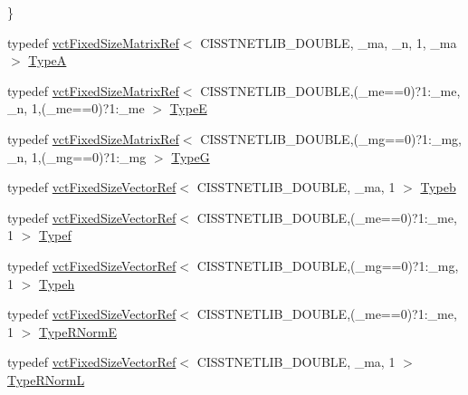 \begin{DoxyCompactItemize}
 \}
\item 
typedef \hyperlink{classvct_fixed_size_matrix_ref}{vct\+Fixed\+Size\+Matrix\+Ref}$<$ C\+I\+S\+S\+T\+N\+E\+T\+L\+I\+B\+\_\+\+D\+O\+U\+B\+L\+E, \+\_\+ma, \+\_\+n, 1, \+\_\+ma $>$ \hyperlink{classnmr_l_sq_lin_solution_fixed_size_a7a9b41c20d4c0b44cdae4bf7b39f7e39}{Type\+A}
\item 
typedef \hyperlink{classvct_fixed_size_matrix_ref}{vct\+Fixed\+Size\+Matrix\+Ref}$<$ C\+I\+S\+S\+T\+N\+E\+T\+L\+I\+B\+\_\+\+D\+O\+U\+B\+L\+E,(\+\_\+me==0)?1\+:\+\_\+me, \+\_\+n, 1,(\+\_\+me==0)?1\+:\+\_\+me $>$ \hyperlink{classnmr_l_sq_lin_solution_fixed_size_a74ac0c633236e0b04e8969f7fbfc92a6}{Type\+E}
\item 
typedef \hyperlink{classvct_fixed_size_matrix_ref}{vct\+Fixed\+Size\+Matrix\+Ref}$<$ C\+I\+S\+S\+T\+N\+E\+T\+L\+I\+B\+\_\+\+D\+O\+U\+B\+L\+E,(\+\_\+mg==0)?1\+:\+\_\+mg, \+\_\+n, 1,(\+\_\+mg==0)?1\+:\+\_\+mg $>$ \hyperlink{classnmr_l_sq_lin_solution_fixed_size_a043640ee3f0a5a11b4b6972ddd9c8b90}{Type\+G}
\item 
typedef \hyperlink{classvct_fixed_size_vector_ref}{vct\+Fixed\+Size\+Vector\+Ref}$<$ C\+I\+S\+S\+T\+N\+E\+T\+L\+I\+B\+\_\+\+D\+O\+U\+B\+L\+E, \+\_\+ma, 1 $>$ \hyperlink{classnmr_l_sq_lin_solution_fixed_size_a9fca08d2c610b0087085dd343e5d171b}{Typeb}
\item 
typedef \hyperlink{classvct_fixed_size_vector_ref}{vct\+Fixed\+Size\+Vector\+Ref}$<$ C\+I\+S\+S\+T\+N\+E\+T\+L\+I\+B\+\_\+\+D\+O\+U\+B\+L\+E,(\+\_\+me==0)?1\+:\+\_\+me, 1 $>$ \hyperlink{classnmr_l_sq_lin_solution_fixed_size_ada2bec63c68d10997259c4c0fff5a085}{Typef}
\item 
typedef \hyperlink{classvct_fixed_size_vector_ref}{vct\+Fixed\+Size\+Vector\+Ref}$<$ C\+I\+S\+S\+T\+N\+E\+T\+L\+I\+B\+\_\+\+D\+O\+U\+B\+L\+E,(\+\_\+mg==0)?1\+:\+\_\+mg, 1 $>$ \hyperlink{classnmr_l_sq_lin_solution_fixed_size_aa86f02bad0142d8bccac845d426bb153}{Typeh}
\item 
typedef \hyperlink{classvct_fixed_size_vector_ref}{vct\+Fixed\+Size\+Vector\+Ref}$<$ C\+I\+S\+S\+T\+N\+E\+T\+L\+I\+B\+\_\+\+D\+O\+U\+B\+L\+E,(\+\_\+me==0)?1\+:\+\_\+me, 1 $>$ \hyperlink{classnmr_l_sq_lin_solution_fixed_size_a8d12c1d86e766d8b7782e39f38b90073}{Type\+R\+Norm\+E}
\item 
typedef \hyperlink{classvct_fixed_size_vector_ref}{vct\+Fixed\+Size\+Vector\+Ref}$<$ C\+I\+S\+S\+T\+N\+E\+T\+L\+I\+B\+\_\+\+D\+O\+U\+B\+L\+E, \+\_\+ma, 1 $>$ \hyperlink{classnmr_l_sq_lin_solution_fixed_size_a61e14c469c463bc06a411061aad13b3a}{Type\+R\+Norm\+L}
\item 

\end{DoxyCompactItemize}
